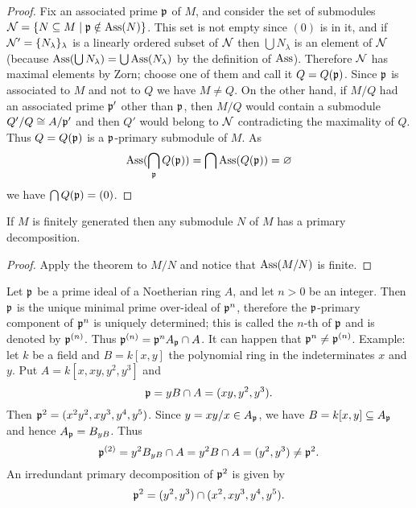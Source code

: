 \documentclass[../main]{subfiles}
\begin{document}
\begin{proof}
Fix an associated prime $\mathfrak{p}$ of $M$, and consider the set of submodules \newline ${\cal N}=\{N\subseteq M\mid\mathfrak{p}\notin\operatorname{Ass}(N)\}$. This set is not empty since $(0)$ is in it, and if \newline ${\cal N}' = \{N_\lambda\}_\lambda$ is a linearly ordered subset of ${\cal N}$ then $\bigcup N_\lambda$ is an element of ${\cal N}$ (because $\operatorname{Ass}(\bigcup N_\lambda)=\bigcup\operatorname{Ass}(N_\lambda)$ by the definition of $\operatorname{Ass}$). Therefore ${\cal N}$ has maximal elements by Zorn; choose one of them and call it $Q = Q(\mathfrak{p})$. Since $\mathfrak{p}$ is associated to $M$ and not to $Q$ we have $M \neq Q$. On the other hand, if $M/Q$ had an associated prime $\mathfrak{p}'$ other than $\mathfrak{p}$, then $M/Q$ would contain a submodule $Q'/Q \cong A/\mathfrak{p}'$ and then $Q'$ would belong to ${\cal N}$ contradicting the maximality of $Q$. Thus $Q = Q(\mathfrak{p})$ is a $\mathfrak{p}$-primary submodule of $M$. As \[\operatorname{Ass}(\bigcap_{\mathfrak{p}}Q(\mathfrak{p}))=\bigcap\operatorname{Ass}(Q(\mathfrak{p}))=\varnothing\] we have $\bigcap Q(\mathfrak{p}) = (0)$.
\end{proof}

\begin{corollary}\label{cor:08.02}
If $M$ is finitely generated then any submodule $N$ of $M$ has a primary decomposition.
\end{corollary}

\begin{proof}
Apply the theorem to $M/N$ and notice that $\operatorname{Ass}(M/N)$ is finite.
\end{proof}

\newparagraph Let $\mathfrak{p}$ be a prime ideal of a Noetherian ring $A$, and let $n > 0$ be an integer. Then $\mathfrak{p}$ is the unique minimal prime over-ideal of $\mathfrak{p}^n$, therefore the $\mathfrak{p}$-primary component of $\mathfrak{p}^n$ is uniquely determined; this is called the $n$-th  of $\mathfrak{p}$ and is denoted by $\mathfrak{p}^{(n)}$. Thus $\mathfrak{p}^{(n)}=\mathfrak{p}^nA_{\mathfrak{p}}\cap A$. It can happen that $\mathfrak{p}^n \neq \mathfrak{p}^{(n)}$. Example: let $k$ be a field and $B = k[x, y]$ the polynomial ring in the indeterminates $x$ and $y$. Put $A = k[x, xy, y^2, y^3]$ and \[\mathfrak{p} = yB\cap A =(xy,y^2,y^3).\] Then $\mathfrak{p}^2=(x^2y^2,xy^3,y^4,y^5)$. Since $y = xy/x\in A_{\mathfrak{p}}$, we have $B = k[x, y]\subseteq A_{\mathfrak{p}}$ and hence $A_{\mathfrak{p}} = B_{yB}$. Thus \[\mathfrak{p}^{(2)}=y^2B_{yB}\cap A=y^2B\cap A=(y^2,y^3)\neq\mathfrak{p}^2.\] An irredundant primary decomposition of $\mathfrak{p}^2$ is given by \[\mathfrak{p}^2=(y^2, y^3)\cap(x^2,xy^3,y^4,y^5).\]
\end{document}
